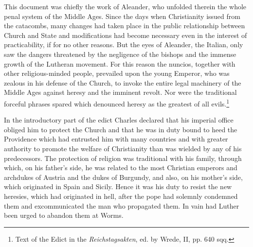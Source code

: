 This document was chiefly the work of Aleander, who unfolded
therein the whole penal system of the Middle Ages. Since the days
when Christianity issued from the catacombs, many changes had taken
place in the public relationship between Church and State and
modifications had become necessary even in the interest of practicability,
if for no other reasons. But the eyes of Aleander, the Italian,
only saw the dangers threatened by the negligence of the bishops
and the immense growth of the Lutheran movement. For this reason
the nuncios, together with other religious-minded people, prevailed
upon the young Emperor, who was zealous in his defense of the
Church, to invoke the entire legal machinery of the Middle Ages
against heresy and the imminent revolt. Nor were the traditional
forceful phrases spared which denounced heresy as the greatest of all
evils.\footnote{Text of the Edict in the \textit{Reichstagsakten}, ed. by Wrede, II, pp. 640 sqq.}

In the introductory part of the edict Charles declared that his imperial
office obliged him to protect the Church and that he was in duty bound to
heed the Providence which had entrusted him with many countries and with
greater authority to promote the welfare of Christianity than was wielded
by any of his predecessors. The protection of religion was traditional with
his family, through which, on his father’s side, he was related to the most
Christian emperors and archdukes of Austria and the dukes of Burgundy,
and also, on his mother’s side, which originated in Spain and Sicily. Hence
it was his duty to resist the new heresies, which had originated in hell, after
the pope had solemnly condemned them and excommunicated the man who
propagated them. In vain had Luther been urged to abandon them at
Worms.

